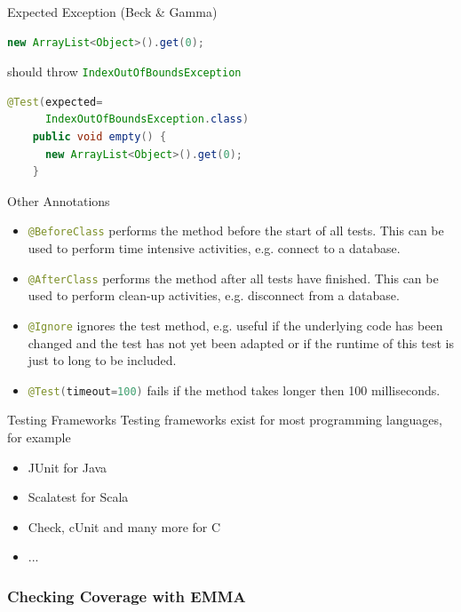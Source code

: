\begin{Frame}[fragile]{Expected Exception (Beck \& Gamma)}
  \begin{lstlisting}[language=java,gobble=4]
    new ArrayList<Object>().get(0);
  \end{lstlisting}
  should throw \lstinline[language=java]-IndexOutOfBoundsException-

  \xxx

  \begin{lstlisting}[language=java,gobble=4]
    @Test(expected=
      IndexOutOfBoundsException.class)
    public void empty() { 
      new ArrayList<Object>().get(0); 
    }
  \end{lstlisting}
\end{Frame}

\begin{Frame}{Other Annotations}
  \begin{itemize}
    \item \lstinline[language=java]-@BeforeClass- performs the method before the start of all tests. This can be used to perform time intensive activities, e.g. connect to a database.
    \item \lstinline[language=java]-@AfterClass- performs the method after all tests have finished. This can be used to perform clean-up activities, e.g. disconnect from a database.
    \item \lstinline[language=java]-@Ignore- ignores the test method, e.g. useful if the underlying code has been changed and the test has not yet been adapted or if the runtime of this test is just to long to be included.
    \item \lstinline[language=java]-@Test(timeout=100)- fails if the method takes longer then 100 milliseconds.
  \end{itemize}
\end{Frame}

\begin{frame}{Testing Frameworks}
Testing frameworks exist for most programming languages, for example
\begin{itemize}
	\item JUnit for Java
	\item Scalatest for Scala
	\item Check, cUnit and many more for C
	\item ...
\end{itemize}
\end{frame}

\subsubsection*{Checking Coverage with EMMA}

